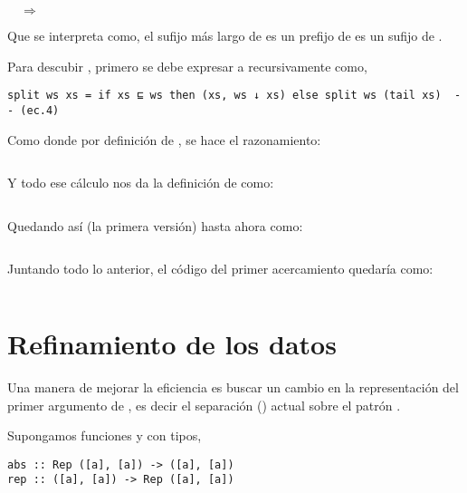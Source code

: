  $\quad\Longrightarrow\quad$ 

Que se interpreta como, el sufijo más largo de  es un prefijo de  es un
sufijo de .

Para descubir , primero se debe expresar a  recursivamente como,
\begin{verbatim}
split ws xs = if xs ⊑ ws then (xs, ws ↓ xs) else split ws (tail xs)  -- (ec.4)
\end{verbatim}

Como  donde por definición de ,
se hace el razonamiento:

\inputminted{haskell}{definiciones/kmp/1-op-raz-eq.hs}

Y todo ese cálculo nos da la definición de  como:

\inputminted{haskell}{definiciones/kmp/1-op.hs}

Quedando así (la primera versión) hasta ahora como:

\inputminted{haskell}{definiciones/kmp/1-final.hs}



Juntando todo lo anterior, el código del primer acercamiento quedaría como:

\inputminted{haskell}{codigo/haskell/1-first-steps.hs}


\section{Refinamiento de los datos}

Una manera de mejorar la eficiencia es buscar un cambio en la representación del primer argumento de , es decir el separación () actual sobre el patrón .

Supongamos funciones  y  con tipos,

\begin{verbatim}
abs :: Rep ([a], [a]) -> ([a], [a])
rep :: ([a], [a]) -> Rep ([a], [a])
\end{verbatim}

